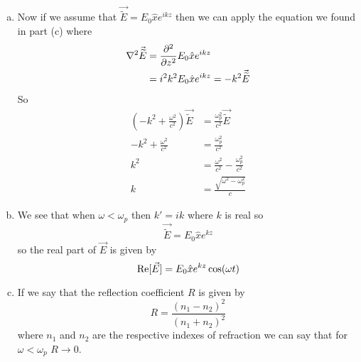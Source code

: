 \documentclass[11pt]{article}
\numberwithin{equation}{section}
\newcommand{\grad}{\bold\nabla}
\begin{document}
\begin{enumerate}[(a)]
\item
Now if we assume that $\vec{\widetilde{E}} = E_0\hat{x}e^{ikz}$ then we can apply the equation we found in part (c) where
\begin{align*}
\grad^2\vec{\widetilde{E}} &= \frac{\partial^2}{\partial z^2}E_0\hat{x}e^{ikz}\\
&= i^2k^2E_0\hat{x}e^{ikz} =  -k^2\vec{\widetilde{E}}
\end{align*}
So
\begin{align*}
\left(-k^2 + \frac{\omega^2}{c^2}\right)\vec{\widetilde{E}} &= \frac{\omega_p^2}{c^2}\vec{\widetilde{E}}\\
-k^2 + \frac{\omega^2}{c^2} &= \frac{\omega_p^2}{c^2}\\
k^2 &= \frac{\omega^2}{c^2} - \frac{\omega_p^2}{c^2}\\
k &= \frac{\sqrt{\omega^2-\omega_p^2}}{c}
\end{align*}

\item
We see that when $\omega<\omega_p$ then $k'=ik$ where $k$ is real so 
$$\vec{\widetilde{E}} = E_0\hat{x}e^{kz}$$
so the real part of $\vec{E}$ is given by
$$\textnormal{Re}[\vec{E}] = E_0\hat{x}e^{kz}\cos(\omega t)$$

\item
If we say that the reflection coefficient $R$ is given by
$$R = \frac{(n_1-n_2)^2}{(n_1+n_2)^2}$$
where $n_1$ and $n_2$ are the respective indexes of refraction we can say that for $\omega<\omega_p$ $R\rightarrow0$.

\end{enumerate}
\end{document}

